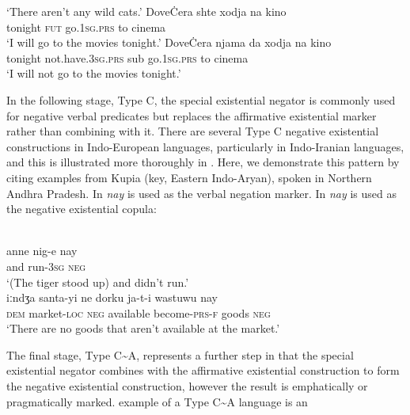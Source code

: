 ﻿\documentclass[output=paper]{langsci/langscibook}
\begin{document}
\begin{exe}
{\begin{exe}
\begin{xlist}
\glt `There aren't any wild cats.'
\ex\gll DoveĊera shte xodja na kino \\
tonight     \textsc{fut} go.\textsc{1sg}.\textsc{prs}  to cinema \\
\glt `I will go to the movies tonight.'
\ex\gll DoveĊera njama                  da   xodja          na  kino\\
tonight not.have.\textsc{3sg}.\textsc{prs} sub go.\textsc{1sg.prs} to
cinema \\
\glt `I will not go to the movies tonight.'
    \end{xlist}\end{exe}
%
In the following stage, Type C, the special existential negator is commonly
used for negative verbal predicates but replaces the affirmative
existential marker rather than combining with it. There are several Type C
negative existential constructions in Indo-European languages, particularly
in Indo-Iranian languages, and this is illustrated more thoroughly in
. Here, we demonstrate this pattern by citing
examples from Kupia (key, Eastern Indo-Aryan), spoken in Northern Andhra
Pradesh. In  \textit{nay} is used as the verbal
negation marker. In  \textit{nay} is used as the negative existential copula:
%
\begin{exe}\ex\begin{xlist}
\ex\label{ex:ieur-kupia-tiger}
\\
    \gll anne nig-e          nay \\
            and   run-\textsc{3sg}      \textsc{neg} \\
    \glt `(The tiger stood up) and didn't run.'
\ex\label{ex:ieur-kupia-market}
\\
\gll iːndʒa santa-yi ne dorku ja-t-i wastuwu nay\\
    \textsc{dem}     market-\textsc{loc} \textsc{neg} available
    become-\textsc{prs-f}
goods      \textsc{neg}\\
\glt `There are no goods that aren't available at the market.'
\end{xlist}\end{exe}
%
The final stage, Type C{\textasciitilde}A, represents a further step in
that the special existential negator combines with the affirmative
existential construction to form the negative existential construction,
however the result is emphatically or pragmatically marked.
 example of a Type C{\textasciitilde}A language is an
}
\end{exe}
\end{document}

